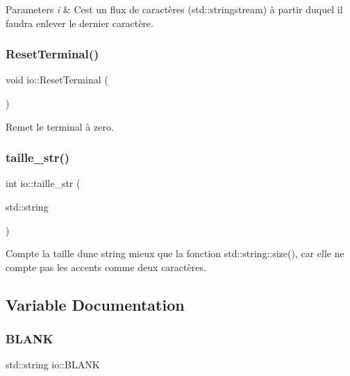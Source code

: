 \begin{DoxyParams}{Parameters}
{\em i} & C\textquotesingle{}est un flux de caractères (std\+::stringstream) à partir duquel il faudra enlever le dernier caractère. \\
\hline
\end{DoxyParams}
\mbox{\label{namespaceio_a44a79937063c75bdcd8f042d5f55d501}} 
\subsubsection{\texorpdfstring{Reset\+Terminal()}{ResetTerminal()}}
{\footnotesize\ttfamily void io\+::\+Reset\+Terminal (\begin{DoxyParamCaption}{ }\end{DoxyParamCaption})}



Remet le terminal à zero. 

\mbox{\label{namespaceio_a0161a5c00ad8e7222f3a052e7c9fa67b}} 
\subsubsection{\texorpdfstring{taille\+\_\+str()}{taille\_str()}}
{\footnotesize\ttfamily int io\+::taille\+\_\+str (\begin{DoxyParamCaption}\item[{std\+::string}]{ }\end{DoxyParamCaption})}



Compte la taille d\textquotesingle{}une string mieux que la fonction std\+::string\+::size(), car elle ne compte pas les accents comme deux caractères. 



\subsection{Variable Documentation}
\mbox{\label{namespaceio_a24918bdd47093eb3f11b694ad6f832d4}} 
\subsubsection{\texorpdfstring{B\+L\+A\+NK}{BLANK}}
{\footnotesize\ttfamily std\+::string io\+::\+B\+L\+A\+NK}



